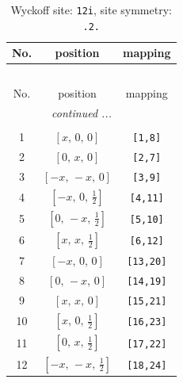\documentclass[fleqn,8pt]{jsarticle}
\begin{document}
\renewcommand{\arraystretch}{1.2}
\begin{longtable}{ccc}
\caption{Wyckoff site: {\tt 12i}, site symmetry: {\tt .2.}}
 \\
 \hline \hline
No. & position & mapping \\ \hline \endfirsthead

\multicolumn{2}{l}{\tablename\ \thetable{}} \\
 \hline \hline
No. & position & mapping \\ \hline \endhead

 \hline \hline
\multicolumn{2}{r}{\footnotesize\it continued ...} \\ \endfoot

 \hline \hline
\multicolumn{2}{r}{} \\ \endlastfoot

1 & $\left[ x,\, 0,\, 0 \right]$ & {\tt [1,8]} \\ \hline
2 & $\left[ 0,\, x,\, 0 \right]$ & {\tt [2,7]} \\ \hline
3 & $\left[ - x,\, - x,\, 0 \right]$ & {\tt [3,9]} \\ \hline
4 & $\left[ - x,\, 0,\, \frac{1}{2} \right]$ & {\tt [4,11]} \\ \hline
5 & $\left[ 0,\, - x,\, \frac{1}{2} \right]$ & {\tt [5,10]} \\ \hline
6 & $\left[ x,\, x,\, \frac{1}{2} \right]$ & {\tt [6,12]} \\ \hline
7 & $\left[ - x,\, 0,\, 0 \right]$ & {\tt [13,20]} \\ \hline
8 & $\left[ 0,\, - x,\, 0 \right]$ & {\tt [14,19]} \\ \hline
9 & $\left[ x,\, x,\, 0 \right]$ & {\tt [15,21]} \\ \hline
10 & $\left[ x,\, 0,\, \frac{1}{2} \right]$ & {\tt [16,23]} \\ \hline
11 & $\left[ 0,\, x,\, \frac{1}{2} \right]$ & {\tt [17,22]} \\ \hline
12 & $\left[ - x,\, - x,\, \frac{1}{2} \right]$ & {\tt [18,24]} \\
\end{longtable}
\renewcommand{\arraystretch}{1.2}
\end{document}
